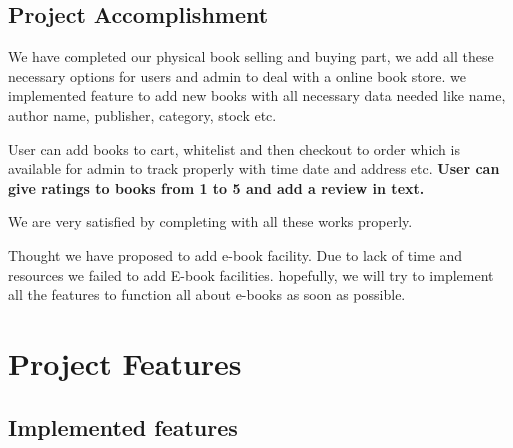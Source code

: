 \documentclass[12pt,a4paper]{article}
\begin{document}
\subsection{Project Accomplishment}
We have completed our physical book selling and buying part, we add all these necessary options for users and admin to deal with a online book store. we implemented feature to add new books with all necessary data needed like name, author name, publisher, category, stock etc.

User can add books to cart, whitelist and then checkout to order which is available for admin to track properly with time date and address etc. \textbf{User can give ratings to books from 1 to 5 and add a review in text.}

We are very satisfied by completing with all these works properly.
\vspace{5mm} %

Thought we have proposed to add e-book facility. Due to lack of time and resources we failed to add E-book facilities. hopefully, we will try to implement all the features to function all about e-books as soon as possible.
\pagebreak
\section{Project Features}
\subsection{Implemented features}
\end{document}
